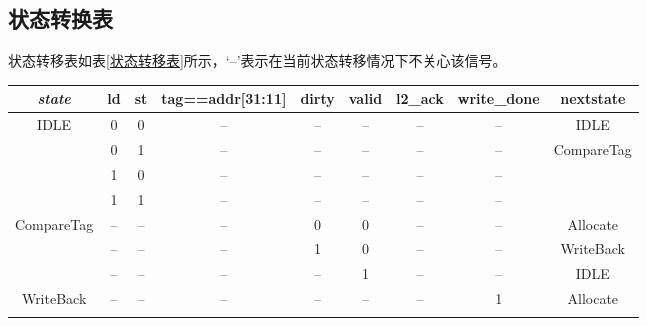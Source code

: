 \documentclass{../source/zjureport}
\begin{document}
        \subsection{状态转换表}
        状态转移表如表\ref{状态转移表}所示，‘--’表示在当前状态转移情况下不关心该信号。
        \begin{table}[H]
            \begin{tabular}{|c|c|c|c|c|c|c|c|c|}
            \hline
            \textit{\textbf{state}}     & \textbf{ld} & \textbf{st} & \textbf{tag==addr{[}31:11{]}} & \textbf{dirty} & \textbf{valid} & \textbf{l2\_ack} & \textbf{write\_done} & \textbf{nextstate}          \\ \hline
            \multirow{4}{*}{IDLE}       & 0           & 0           & --                            & --             & --             & --               & --                   & IDLE                        \\ \cline{2-9} 
                                        & 0           & 1           & --                            & --             & --             & --               & --                   & \multirow{3}{*}{CompareTag} \\ \cline{2-8}
                                        & 1           & 0           & --                            & --             & --             & --               & --                   &                             \\ \cline{2-8}
                                        & 1           & 1           & --                            & --             & --             & --               & --                   &                             \\ \hline
            \multirow{3}{*}{CompareTag} & --          & --          & --                            & 0              & 0              & --               & --                   & Allocate                    \\ \cline{2-9} 
                                        & --          & --          & --                            & 1              & 0              & --               & --                   & WriteBack                   \\ \cline{2-9} 
                                        & --          & --          & --                            & --             & 1              & --               & --                   & IDLE                        \\ \hline
            \multirow{2}{*}{WriteBack}  & --          & --          & --                            & --             & --             & --               & 1                    & Allocate                    \\ \cline{2-9} 

\end{tabular}
\end{table}
\end{document}
